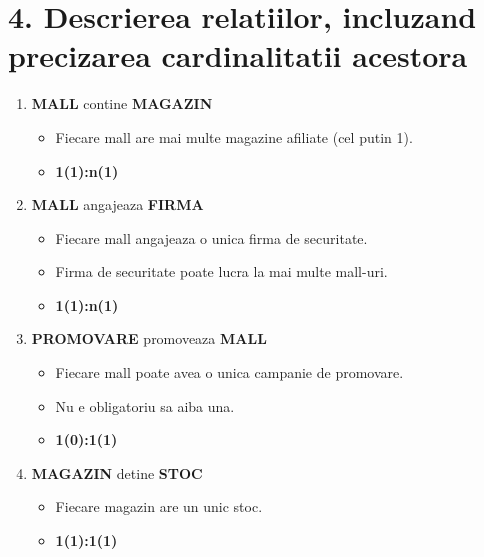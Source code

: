 
\section*{4. Descrierea relatiilor, incluzand precizarea cardinalitatii acestora
}
\vspace{1cm}
\begin{enumerate}
    \item \textbf{MALL} contine \textbf{MAGAZIN}
    \begin{itemize}
        \item Fiecare mall are mai multe magazine afiliate (cel putin 1).
        \item \textbf{1(1):n(1)}
    \end{itemize}
    
    \vspace{0.5cm}

    \item \textbf{MALL} angajeaza \textbf{FIRMA}
    \begin{itemize}
        \item Fiecare mall angajeaza o unica firma de securitate.
        \item Firma de securitate poate lucra la mai multe mall-uri. 
        \item \textbf{1(1):n(1)}
    \end{itemize}

    \vspace{0.5cm}

    \item \textbf{PROMOVARE} promoveaza \textbf{MALL}
    \begin{itemize}
        \item Fiecare mall poate avea o unica campanie de promovare.
        \item Nu e obligatoriu sa aiba una. 
        \item \textbf{1(0):1(1)}
    \end{itemize}

    \vspace{0.5cm}

    \item \textbf{MAGAZIN} detine \textbf{STOC}
    \begin{itemize}
        \item Fiecare magazin are un unic stoc.
        \item \textbf{1(1):1(1)}
    \end{itemize}


\end{enumerate}
